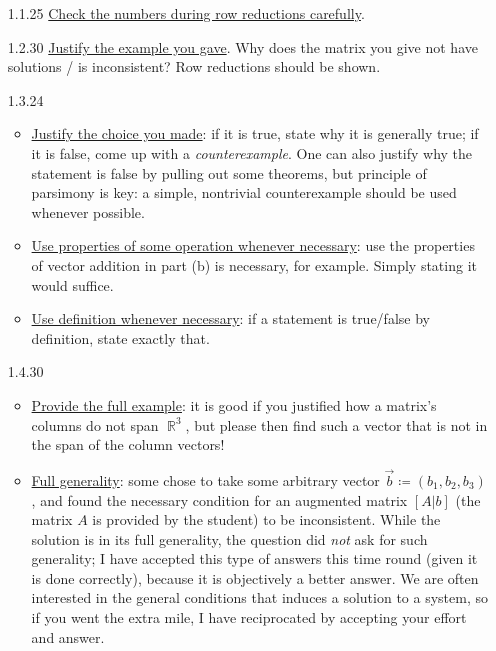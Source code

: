 \documentclass{amsart}
\theoremstyle{definition}
\theoremstyle{definition}
\DeclareMathOperator{\R}{\mathbb{R}}
\DeclareMathOperator{\1}{\mathbbm{1}}
\begin{document}
\begin{enumerate}[itemsep = 1.5mm]
	\item[1.1.25] \uline{Check the numbers during row reductions carefully}.
	
	
	\item[1.2.30] \uline{Justify the example you gave}. Why does the matrix you give not have solutions / is inconsistent? Row reductions should be shown.
	
	\item[1.3.24] \begin{itemize}
		\item \uline{Justify the choice you made}: if it is true, state why it is generally true; if it is false, come up with a \textit{counterexample}. One can also justify why the statement is false by pulling out some theorems, but principle of parsimony is key: a simple, nontrivial counterexample should be used whenever possible.
		
		\item \uline{Use properties of some operation whenever necessary}: use the properties of vector addition in part (b) is necessary, for example. Simply stating it would suffice.
		
		\item \uline{Use definition whenever necessary}: if a statement is true/false by definition, state exactly that.
	\end{itemize}

	
	\item[1.4.30] \begin{itemize}
		\item \uline{Provide the full example}: it is good if you justified how a matrix's columns do not span $\R^3$, but please then find such a vector that is not in the span of the column vectors!
		
		\item \uline{Full generality}: some chose to take some arbitrary vector $\vec{b} \coloneqq (b_1,b_2,b_3)$, and found the necessary condition for an augmented matrix $[A | b]$ (the matrix $A$ is provided by the student) to be inconsistent. While the solution is in its full generality, the question did \textit{not} ask for such generality; I have accepted this type of answers this time round (given it is done correctly), because it is objectively a better answer. We are often interested in the general conditions that induces a solution to a system, so if you went the extra mile, I have reciprocated by accepting your effort and answer.
		

\end{itemize}
\end{enumerate}
\end{document}
